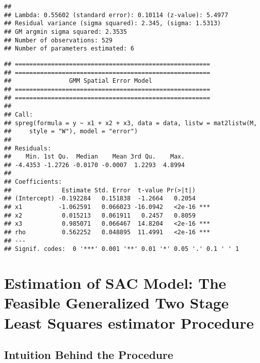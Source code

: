 \begin{knitrout}
\begin{kframe}
\begin{verbatim}
## 
## Lambda: 0.55602 (standard error): 0.10114 (z-value): 5.4977
## Residual variance (sigma squared): 2.345, (sigma: 1.5313)
## GM argmin sigma squared: 2.3535
## Number of observations: 529 
## Number of parameters estimated: 6
\end{verbatim}
\begin{alltt}
\hlstd{(}\hlstd{)}
    \hlkwb{<-}  \hlopt{~}  \hlopt{+}  \hlopt{+} 
                         
                         \hlstd{=}   \hlstd{=} \hlstd{),}
                         \hlstd{=} \hlstd{)}
\end{alltt}
\begin{verbatim}
## ======================================================
## ======================================================
##                GMM Spatial Error Model
## ======================================================
## ======================================================
## 
## Call:
## spreg(formula = y ~ x1 + x2 + x3, data = data, listw = mat2listw(M, 
##     style = "W"), model = "error")
## 
## Residuals:
##    Min. 1st Qu.  Median    Mean 3rd Qu.    Max. 
## -4.4353 -1.2726 -0.0170 -0.0007  1.2293  4.8994 
## 
## Coefficients:
##              Estimate Std. Error  t-value Pr(>|t|)    
## (Intercept) -0.192284   0.151838  -1.2664   0.2054    
## x1          -1.062591   0.066023 -16.0942   <2e-16 ***
## x2           0.015213   0.061911   0.2457   0.8059    
## x3           0.985071   0.066467  14.8204   <2e-16 ***
## rho          0.562252   0.048895  11.4991   <2e-16 ***
## ---
## Signif. codes:  0 '***' 0.001 '**' 0.01 '*' 0.05 '.' 0.1 ' ' 1
\end{verbatim}
\end{kframe}
\end{knitrout}


\section{Estimation of SAC Model: The Feasible Generalized Two Stage Least Squares estimator Procedure}\label{sec:sfg2sls-sac}

\subsection{Intuition Behind the Procedure}

